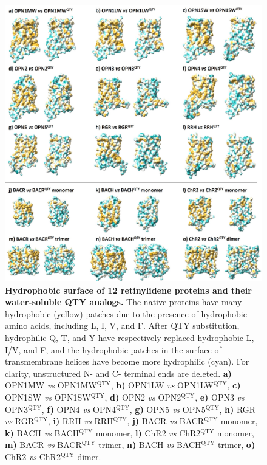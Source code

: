 \documentclass[fleqn, 10pt, lineno]{manuscript}
\begin{document}
\begin{figure}[htbp]
	\centering
	\includegraphics[width=\linewidth]{Figures/hydrophobicity.jpg}
	\caption{\textbf{Hydrophobic surface of 12 retinylidene proteins and their water-soluble QTY analogs. } The native proteins have many hydrophobic (yellow) patches due to the presence of hydrophobic amino acids, including L, I, V, and F. After QTY substitution, hydrophilic Q, T, and Y have respectively replaced hydrophobic L, I/V, and F, and the hydrophobic patches in the surface of transmembrane helices have become more hydrophilic (cyan). For clarity, unstructured N- and C- terminal ends are deleted. 
    \textbf{a)} OPN1MW \textit{vs} OPN1MW$^{\textrm{QTY}}$, 
    \textbf{b)} OPN1LW \textit{vs} OPN1LW$^{\textrm{QTY}}$, 
    \textbf{c)} OPN1SW \textit{vs} OPN1SW$^{\textrm{QTY}}$, 
    \textbf{d)} OPN2 \textit{vs} OPN2$^{\textrm{QTY}}$, 
    \textbf{e)} OPN3 \textit{vs} OPN3$^{\textrm{QTY}}$, 
    \textbf{f)} OPN4 \textit{vs} OPN4$^{\textrm{QTY}}$, 
    \textbf{g)} OPN5 \textit{vs} OPN5$^{\textrm{QTY}}$, 
    \textbf{h)} RGR \textit{vs} RGR$^{\textrm{QTY}}$, 
    \textbf{i)} RRH \textit{vs} RRH$^{\textrm{QTY}}$, 
    \textbf{j)} BACR \textit{vs} BACR$^{\textrm{QTY}}$ monomer, 
    \textbf{k)} BACH \textit{vs} BACH$^{\textrm{QTY}}$ monomer, 
    \textbf{l)} ChR2 \textit{vs} ChR2$^{\textrm{QTY}}$ monomer, 
    \textbf{m)} BACR \textit{vs} BACR$^{\textrm{QTY}}$ trimer, 
    \textbf{n)} BACH \textit{vs} BACH$^{\textrm{QTY}}$ trimer, 
    \textbf{o)} ChR2 \textit{vs} ChR2$^{\textrm{QTY}}$ dimer. 
    }
	\label{fig:hydrophobicity}
\end{figure}
\end{document}
